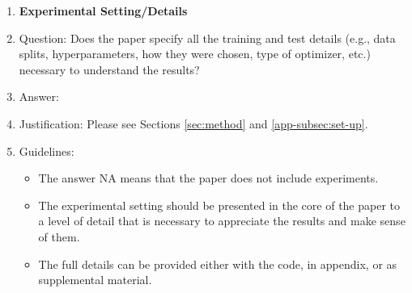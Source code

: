 \documentclass{article}
\begin{document}
\begin{enumerate}
\item {\bf Experimental Setting/Details}
    \item[] Question: Does the paper specify all the training and test details (e.g., data splits, hyperparameters, how they were chosen, type of optimizer, etc.) necessary to understand the results?
    \item[] Answer: \answerYes{} %
    \item[] Justification: Please see Sections \ref{sec:method} and \ref{app-subsec:set-up}.
    \item[] Guidelines:
    \begin{itemize}
        \item The answer NA means that the paper does not include experiments.
        \item The experimental setting should be presented in the core of the paper to a level of detail that is necessary to appreciate the results and make sense of them.
        \item The full details can be provided either with the code, in appendix, or as supplemental material.
    \end{itemize}


\end{enumerate}
\end{document}
